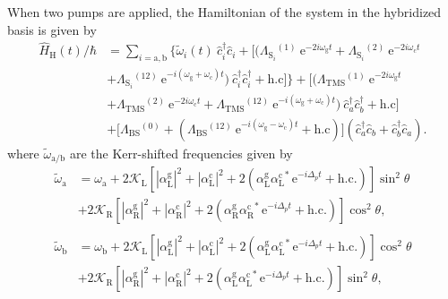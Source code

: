 \documentclass[%
reprint,
floatfix,
superscriptaddress,
amsmath,amssymb,
aps,
pra,
]{revtex4-2}
\newcommand*{\scrpt}[1]{\mathrm{#1}}
\newcommand*{\s}[1]{\ensuremath{_\scrpt{#1}}}
\begin{document}
When two pumps are applied, the Hamiltonian of the system in the hybridized basis is given by
%
\begin{align}
   \label{H_lin_H}
    \hat H\s{H} (t) / \hbar & = \sum_{i = \mathrm{a}, \mathrm{b}} \Big \lbrace \tilde{\omega}_i (t) \: \hat c_i^{\dagger} \hat c_i  + \Big [\Big( \Lambda\mathrm{_{S_\textit{i}}}^{(1)} \: \mathrm{e}^{-2 i \omega\s{g} t} + \Lambda\mathrm{_{S_\textit{i}}}^{(2)} \: \mathrm{e}^{-2 i \omega\s{c} t} \nonumber 
    \\
    & + \Lambda\mathrm{_{S_\textit{i}}}^{(12)} \: \mathrm{e}^{- i (\omega\s{g} + \omega\s{c}) t} \Big) \: \hat c_i^{\dagger} \hat c_i^{\dagger} + \mathrm{h.c} \Big] \Big \rbrace  +  \Big[ \Big( \Lambda\s{TMS}^{(1)} \: \mathrm{e}^{-2 i \omega\s{g} t} \nonumber  \\
    & +\Lambda\s{TMS}^{(2)} \: \mathrm{e}^{-2 i \omega\s{c} t} + \Lambda\s{TMS}^{(12)} \: \mathrm{e}^{- i (\omega\s{g} + \omega\s{c}) t} \Big) \: \hat c_a^{\dagger} \hat c_b^{\dagger} + \mathrm{h.c} \Big] \nonumber \\
    & + \Big[ \Lambda\s{BS}^{(0)} + \left( \Lambda\s{BS}^{(12)} \: \mathrm{e}^{-i (\omega\s{g} - \omega\s{c}) t} + \mathrm{h.c} \right) \Big] \left(\hat c_a^{\dagger} \hat c_b + \hat c_b^{\dagger} \hat c_a \right).
\end{align}
% 
where $\tilde{\omega}\mathrm{_{a/b}}$ are the Kerr-shifted frequencies given by
%
\begin{align}
\label{WAB_HL}
\tilde{\omega}\s{a}  & = \omega\s{a}  + 2 \mathcal{K}\s{L} \left[ |\alpha\mathrm{^{g}_{L}}|^2 + |\alpha\mathrm{^{c}_{L}}|^2 + 2 \left( \alpha\mathrm{^{g}_{L}} \alpha\mathrm{^{c}_{L}}^* \, \mathrm{e}^{-i \Delta_p t} + \mathrm{h.c.} \right) \right] \sin^2 \theta  \nonumber \\
& + 2 \mathcal{K}\s{R} \left[|\alpha\mathrm{^{g}_{R}}|^2 + |\alpha\mathrm{^{c}_{R}}|^2 + 2 \left( \alpha\mathrm{^{g}_{R}} \alpha\mathrm{^{c}_{R}}^* \, \mathrm{e}^{-i \Delta_p t} + \mathrm{h.c.} \right)  \right] \cos^2\theta , \nonumber \\
\\
\tilde{\omega}\s{b}   & = \omega\s{b}  +  2 \mathcal{K}\s{L} \left[ |\alpha\mathrm{^{g}_{L}}|^2 + |\alpha\mathrm{^{c}_{L}}|^2 + 2 \left( \alpha\mathrm{^{g}_{L}} \alpha\mathrm{^{c}_{L}}^* \, \mathrm{e}^{-i \Delta_p t} + \mathrm{h.c.} \right) \right] \cos^2 \theta  \nonumber \\
& + 2 \mathcal{K}\s{R} \left[|\alpha\mathrm{^{g}_{R}}|^2 + |\alpha\mathrm{^{c}_{R}}|^2 + 2 \left( \alpha\mathrm{^{g}_{L}} \alpha\mathrm{^{c}_{L}}^* \, \mathrm{e}^{-i \Delta_p t} + \mathrm{h.c.} \right) \right] \sin^2\theta  , \nonumber
\end{align}
\end{document}
